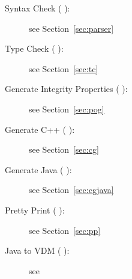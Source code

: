 \documentclass[\pformat,12pt]{article}
\newcommand{\guicmd}[1]{{\sf #1}}
\begin{document}
\begin{description}

\item[\guicmd{Syntax Check} (\hspace{-1.8mm}
):] see Section~\ref{sec:parser} 

\item[\guicmd{Type Check} (\hspace{-1.8mm}
):] see Section~\ref{sec:tc} 

\item[\guicmd{Generate Integrity Properties} (\hspace{-1.8mm}
):] see Section~\ref{sec:pog} 

\item[\guicmd{Generate C++} (\hspace{-1.8mm}
):] see Section~\ref{sec:cg} 

\item[\guicmd{Generate Java} (\hspace{-1.8mm}
):] see Section~\ref{sec:cgjava}

\item[\guicmd{Pretty Print} (\hspace{-1.8mm}
):] see Section~\ref{sec:pp}

\item[\guicmd{Java to VDM} (\hspace{-1.8mm}
):] see~\cite{Java2VDMMan-SCSK}



\end{description}
\end{document}
